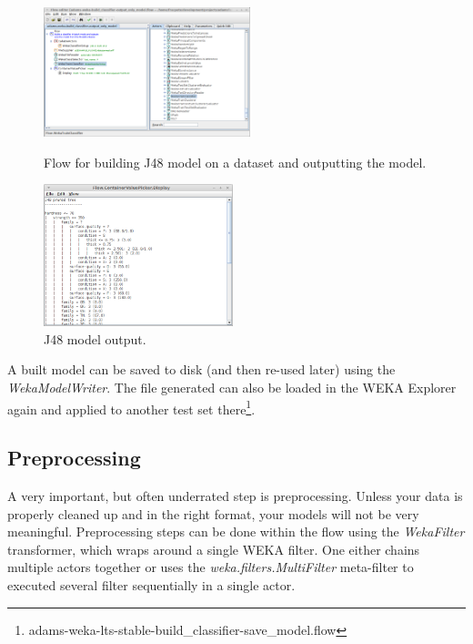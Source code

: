 \begin{figure}[ht]
  \begin{minipage}[t]{0.5\linewidth}
    \centering
    \includegraphics[width=6.0cm]{images/basic-building_model1-flow.png}
    \caption{Flow for building J48 model on a dataset and outputting the model.}
    \label{basic-building_model1-flow}
  \end{minipage}
  \hspace{0.5cm}
  \begin{minipage}[t]{0.5\linewidth}
    \centering
    \includegraphics[width=5.5cm]{images/basic-building_model1-output.png}
    \caption{J48 model output.}
    \label{basic-building_model1-output}
  \end{minipage}
\end{figure}

A built model can be saved to disk (and then re-used later) using the
\textit{WekaModelWriter}. The file generated can also be loaded in the WEKA
Explorer again and applied to another test set
there\footnote{adams-weka-lts-stable-build\_classifier-save\_model.flow}.

\subsection{Preprocessing}
A very important, but often underrated step is preprocessing. Unless your data
is properly cleaned up and in the right format, your models will not be very
meaningful. Preprocessing steps can be done within the flow using the
\textit{WekaFilter} transformer, which wraps around a single WEKA filter. One
either chains multiple actors together or uses the
\textit{weka.filters.MultiFilter} meta-filter to executed several filter
sequentially in a single actor.

